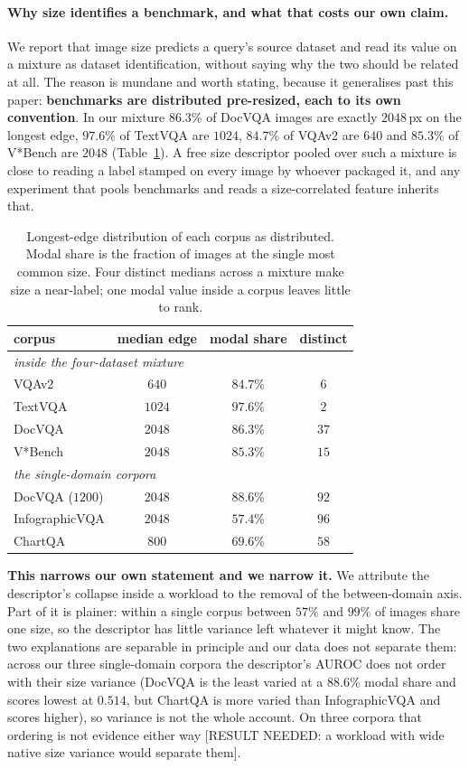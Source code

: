 \documentclass[10pt,twocolumn]{article}
\theoremstyle{plain}
\begin{document}
\paragraph{Why size identifies a benchmark, and what that costs our own claim.}
We report that image size predicts a query's source dataset and read its value
on a mixture as dataset identification, without saying why the two should be
related at all. The reason is mundane and worth stating, because it generalises
past this paper: \textbf{benchmarks are distributed pre-resized, each to its own
convention}. In our mixture $86.3\%$ of DocVQA images are exactly $2048$\,px on
the longest edge, $97.6\%$ of TextVQA are $1024$, $84.7\%$ of VQAv2 are $640$
and $85.3\%$ of V*Bench are $2048$ (Table~\ref{tab:sizes}). A free size
descriptor pooled over such a mixture is close to reading a label stamped on
every image by whoever packaged it, and any experiment that pools benchmarks
and reads a size-correlated feature inherits that.

\begin{table}[t]
\centering\small
\setlength{\tabcolsep}{5pt}
\begin{tabular}{lccc}
\toprule
corpus & median edge & modal share & distinct \\
\midrule
\multicolumn{4}{l}{\emph{inside the four-dataset mixture}} \\
VQAv2 & $640$ & $84.7\%$ & $6$ \\
TextVQA & $1024$ & $97.6\%$ & $2$ \\
DocVQA & $2048$ & $86.3\%$ & $37$ \\
V*Bench & $2048$ & $85.3\%$ & $15$ \\
\midrule
\multicolumn{4}{l}{\emph{the single-domain corpora}} \\
DocVQA ($1200$) & $2048$ & $88.6\%$ & $92$ \\
InfographicVQA & $2048$ & $57.4\%$ & $96$ \\
ChartQA & $800$ & $69.6\%$ & $58$ \\
\bottomrule
\end{tabular}
\caption{Longest-edge distribution of each corpus as distributed. Modal share
is the fraction of images at the single most common size. Four distinct medians
across a mixture make size a near-label; one modal value inside a corpus leaves
little to rank.}
\label{tab:sizes}
\end{table}

\textbf{This narrows our own statement and we narrow it.} We attribute the
descriptor's collapse inside a workload to the removal of the between-domain
axis. Part of it is plainer: within a single corpus between $57\%$ and $99\%$
of images share one size, so the descriptor has little variance left whatever it
might know. The two explanations are separable in principle and our data does
not separate them: across our three single-domain corpora the descriptor's
AUROC does not order with their size variance (DocVQA is the least varied at a
$88.6\%$ modal share and scores lowest at $0.514$, but ChartQA is more varied
than InfographicVQA and scores higher), so variance is not the whole account.
On three corpora that ordering is not evidence either way
[RESULT NEEDED: a workload with wide native size variance would separate them].
\end{document}
